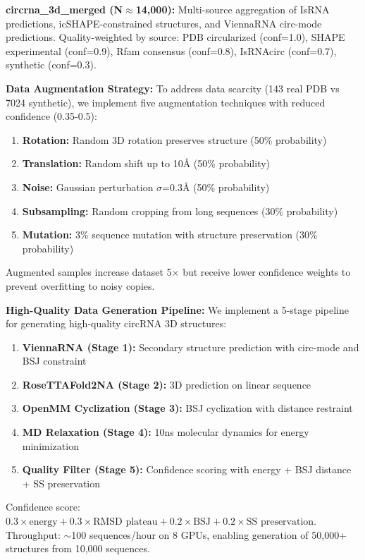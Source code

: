 \documentclass[12pt]{article}
\begin{document}
\textbf{circrna\_3d\_merged (N$\approx$14,000):} Multi-source aggregation of IsRNA predictions, icSHAPE-constrained structures, and ViennaRNA circ-mode predictions. Quality-weighted by source: PDB circularized (conf=1.0), SHAPE experimental (conf=0.9), Rfam consensus (conf=0.8), IsRNAcirc (conf=0.7), synthetic (conf=0.3).

\textbf{Data Augmentation Strategy:} To address data scarcity (143 real PDB vs 7024 synthetic), we implement five augmentation techniques with reduced confidence (0.35-0.5):
\begin{enumerate}
\item \textbf{Rotation:} Random 3D rotation preserves structure (50\% probability)
\item \textbf{Translation:} Random shift up to 10Å (50\% probability)
\item \textbf{Noise:} Gaussian perturbation $\sigma$=0.3Å (50\% probability)
\item \textbf{Subsampling:} Random cropping from long sequences (30\% probability)
\item \textbf{Mutation:} 3\% sequence mutation with structure preservation (30\% probability)
\end{enumerate}
Augmented samples increase dataset 5$\times$ but receive lower confidence weights to prevent overfitting to noisy copies.

\textbf{High-Quality Data Generation Pipeline:} We implement a 5-stage pipeline for generating high-quality circRNA 3D structures:
\begin{enumerate}
\item \textbf{ViennaRNA (Stage 1):} Secondary structure prediction with circ-mode and BSJ constraint
\item \textbf{RoseTTAFold2NA (Stage 2):} 3D prediction on linear sequence
\item \textbf{OpenMM Cyclization (Stage 3):} BSJ cyclization with distance restraint
\item \textbf{MD Relaxation (Stage 4):} 10ns molecular dynamics for energy minimization
\item \textbf{Quality Filter (Stage 5):} Confidence scoring with energy + BSJ distance + SS preservation
\end{enumerate}
Confidence score: $0.3 \times \text{energy} + 0.3 \times \text{RMSD plateau} + 0.2 \times \text{BSJ} + 0.2 \times \text{SS preservation}$. Throughput: $\sim$100 sequences/hour on 8 GPUs, enabling generation of 50,000+ structures from 10,000 sequences.
\end{document}
